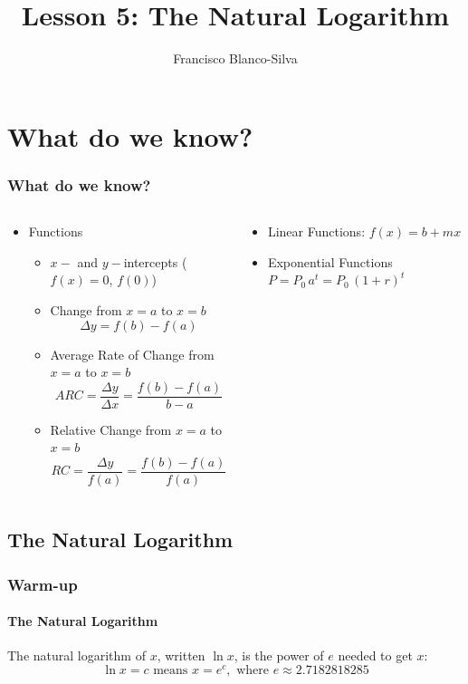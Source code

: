 \documentclass[9pt,xcolor=x11names,compress]{beamer}
\title{Lesson 5: The Natural Logarithm}
\author[Francisco Blanco-Silva]{Francisco Blanco-Silva}
\institute[USC]{University of South Carolina}
\date{
	\begin{tikzpicture} 
    \draw [blue!75!black, rotate=90]
    [l-system={rule set={F -> FF-[-F+F]+[+F-F]}, axiom=F, order=4, step=2pt, 
        randomize step percent=25, angle=30, randomize angle percent=15}]
    lindenmayer system; 
	\end{tikzpicture}
	\\
}
\begin{document}
\frame{\titlepage}

\section{What do we know?}
\begin{frame}
\frametitle{What do we know?}
\begin{columns}[T]
\begin{column}{0.6\linewidth}
\begin{itemize}
\item Functions
\begin{itemize}
\item $x-$ and $y-$intercepts ($f(x)=0$, $f(0)$)
\item Change from $x=a$ to $x=b$ 
\begin{equation*}
	\Delta y = f(b)-f(a)
\end{equation*}
\item Average Rate of Change from $x=a$ to $x=b$
\begin{equation*}
ARC=\frac{\Delta y}{\Delta x}=\frac{f(b)-f(a)}{b-a} 
\end{equation*}
\item Relative Change from $x=a$ to $x=b$
\begin{equation*}
RC=\frac{\Delta y}{f(a)}=\frac{f(b)-f(a)}{f(a)}
\end{equation*}
\end{itemize}
\end{itemize}
\end{column}
\begin{column}{0.4\linewidth}
\begin{itemize}
	\item Linear Functions: $f(x)=b+mx$
	\item Exponential Functions $P=P_0\, a^t = P_0\, (1+r)^t$
\end{itemize}
\end{column}
\end{columns}
\end{frame}

\subsection{The Natural Logarithm}

\begin{frame}[t]\frametitle{Warm-up}
\framesubtitle{The Natural Logarithm}
  \begin{definition}
     The \alert{natural logarithm} of $x$, written $\ln x$, is the power of $e$ needed to get $x$:
     \begin{equation*}
      \ln x = c \text{ means } x=e^c, \text{ where } e\approx 2.7182818285
     \end{equation*}
  \end{definition}  
\end{frame}
\end{document}
